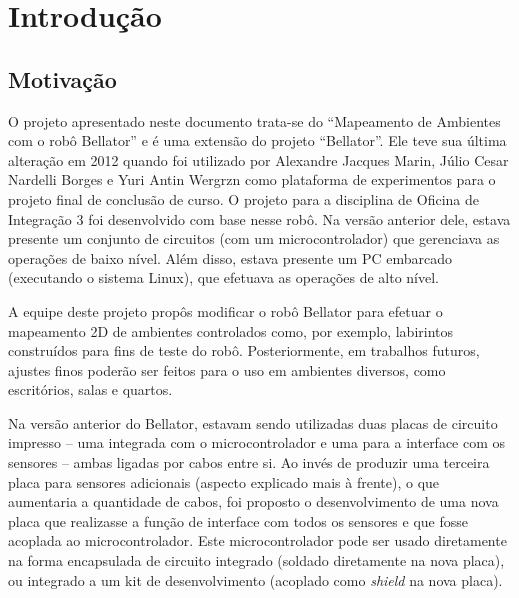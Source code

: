 \chapter{Introdução}

\section{Motivação}

O projeto apresentado neste documento trata-se do “Mapeamento de Ambientes com o robô Bellator” e é uma extensão do projeto “Bellator”. Ele teve sua última alteração em 2012 quando foi utilizado por Alexandre Jacques Marin, Júlio Cesar Nardelli Borges e Yuri Antin Wergrzn como plataforma de experimentos para o projeto final de conclusão de curso. O projeto para a disciplina de Oficina de Integração 3 foi desenvolvido com base nesse robô. Na versão anterior dele, estava presente um conjunto de circuitos (com um microcontrolador) que gerenciava as operações de baixo nível. Além disso, estava presente um PC embarcado (executando o sistema Linux), que efetuava as operações de alto nível.

A equipe deste projeto propôs modificar o robô Bellator para efetuar o mapeamento 2D de ambientes controlados como, por exemplo, labirintos construídos para fins de teste do robô. Posteriormente, em trabalhos futuros, ajustes finos poderão ser feitos para o uso em ambientes diversos, como escritórios, salas e quartos.

Na versão anterior do Bellator, estavam sendo utilizadas duas placas de circuito impresso – uma integrada com o microcontrolador e uma para a interface com os sensores – ambas ligadas por cabos entre si. Ao invés de produzir uma terceira placa para sensores adicionais (aspecto explicado mais à frente), o que aumentaria a quantidade de cabos, foi proposto o desenvolvimento de uma nova placa que realizasse a função de interface com todos os sensores e que fosse acoplada ao microcontrolador. Este microcontrolador pode ser usado diretamente na forma encapsulada de circuito integrado (soldado diretamente na nova placa), ou integrado a um kit de desenvolvimento (acoplado como \textit{shield} na nova placa).

